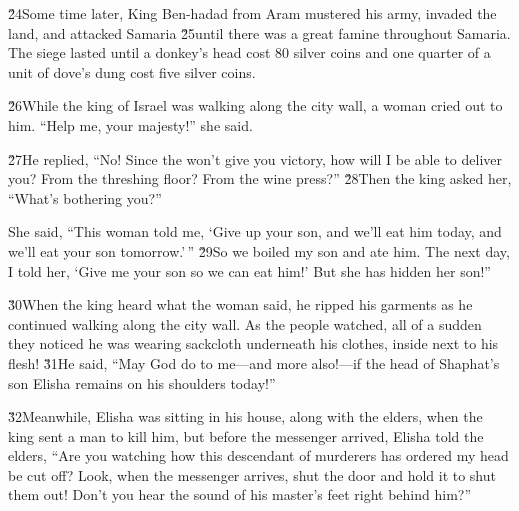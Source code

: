 \v{24}Some time later, King Ben-hadad from Aram mustered his army, invaded the land, and attacked Samaria \v{25}until there was a great famine throughout Samaria. The siege lasted until a donkey's head cost 80 silver coins and one quarter of a unit of dove's dung cost five silver coins.

\v{26}While the king of Israel was walking along the city wall, a woman cried out to him. ``Help me, your majesty!'' she said.

\v{27}He replied, ``No! Since the  won't give you victory, how will I be able to deliver you? From the threshing floor? From the wine press?'' \v{28}Then the king asked her, ``What's bothering you?''

She said, ``This woman told me, `Give up your son, and we'll eat him today, and we'll eat your son tomorrow.'\,'' \v{29}So we boiled my son and ate him. The next day, I told her, `Give me your son so we can eat him!' But she has hidden her son!''

\v{30}When the king heard what the woman said, he ripped his garments as he continued walking along the city wall. As the people watched, all of a sudden they noticed he was wearing sackcloth underneath his clothes, inside next to his flesh! \v{31}He said, ``May God do to me---and more also!---if the head of Shaphat's son Elisha remains on his shoulders today!''

\v{32}Meanwhile, Elisha was sitting in his house, along with the elders, when the king sent a man to kill him, but before the messenger arrived, Elisha told the elders, ``Are you watching how this descendant of murderers has ordered my head be cut off? Look, when the messenger arrives, shut the door and hold it to shut them out! Don't you hear the sound of his master's feet right behind him?''

